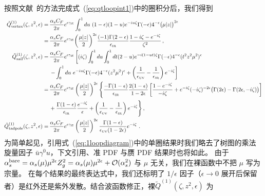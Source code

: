 \begin{widetext}
按照文献~\cite{Ji:2017rah}的方法完成式~(\ref{eq:qtloopint1})中的圈积分后，我们得到
\begin{align}\label{eq:1loopdiagram}
\tilde{Q}^{(1)}_{\rm vertex}(\zeta,z^2,\epsilon)
=\,& {\alpha_sC_F\over 2\pi}e^{\epsilon\gamma_E} \int_0^1 du\ (1-\epsilon)(1-u) e^{-iu \zeta}\Gamma(-\epsilon) 4^{-\epsilon} \big(\mu |z|\big)^{2\epsilon}
  \\
 =\,& {\alpha_sC_F\over 2\pi} e^{\epsilon\gamma_E}\biggl({\mu|z|\over2}\biggr)^{2\epsilon}
 \frac{(-1)\Gamma(2-\epsilon)}{\epsilon_{\mbox{\tiny IR}}}
 {1-i\zeta - e^{-i\zeta}\over \zeta^2}
  \,, \nonumber\\
\tilde{Q}^{(1)}_{\rm sail}(\zeta,z^2,\epsilon)
=\, & {\alpha_sC_F\over 2\pi}  e^{\epsilon\gamma_E}\left[(i\zeta) \int_0^1 du \int_0^1 dt (2-u) e^{-i(1-ut)\zeta} \Gamma(-\epsilon) 4^{-\epsilon}(t^2z^2\mu^2)^{\epsilon}\right.
  \nonumber\\
 &\left. -\int_0^1 du \ e^{-iu \zeta}\Gamma(-\epsilon) 4^{-\epsilon}(z^2\mu^2)^{\epsilon}  + \left({1\over\epsilon_{\mbox{\tiny UV}}} - {1\over \epsilon_{\mbox{\tiny IR}}}\right) e^{-i\zeta}\right]
  \nonumber\\
 =\,& {\alpha_sC_F\over 2\pi} e^{\epsilon\gamma_E} \left({\mu|z|\over2}\right)^{2\epsilon}
 \Bigg\{\frac{-\Gamma(1-\epsilon)}{\epsilon_{\mbox{\tiny IR}}}
 {2(1-\epsilon)\over 1-2\epsilon} \left[{1-e^{-i\zeta}\over -i\zeta} + e^{-i\zeta}(-i\zeta)^{-2\epsilon}\big(\Gamma(2\epsilon)-\Gamma(2\epsilon,-i\zeta)\big)
 \right]
  \nn\\
 & + {\Gamma(1-\epsilon)\over \epsilon_{\mbox{\tiny IR}} } \frac{e^{-i\zeta}}{\epsilon} + \left({1\over\epsilon_{\mbox{\tiny UV}}} - {1\over \epsilon_{\mbox{\tiny IR}}}\right) e^{-i\zeta} \Bigg\}
  \,, \nn\\
\tilde{Q}^{(1)}_{\rm tadpole}(\zeta,z^2,\epsilon)
=\, & {\alpha_sC_F\over 2\pi} e^{\epsilon\gamma_E}\left({\mu|z|\over2}\right)^{2\epsilon}  {\Gamma(1-\epsilon)\over \epsilon_{\mbox{\tiny UV}} (1-2\epsilon)}e^{-i\zeta}
 \ . \nn
\end{align}
为简单起见，引用式~(\ref{eq:1loopdiagram})中的单圈结果时我们略去了树图的乘法旋量因子 $\bar u\gamma^0 u$，下文引用\spcorr、准 PDF 与赝 PDF 结果时也将如此。
由于 $\alpha_s^{\rm bare}=\alpha_s(\mu) \mu^{2\epsilon} Z_g^2 = \alpha_s(\mu) \mu^{2\epsilon} + {\cal O}(\alpha_s^2)$ 与 $\mu$ 无关，我们在裸函数中不把 $\mu$ 写为宗量。
在每个结果的最终表达式中，我们还标明了 $1/\epsilon$ 因子（$\epsilon\to 0$ 展开后保留者）是红外还是紫外发散。结合波函数修正，裸\spcorr $\tilde{Q}^{(1)}(\zeta,z^2,\epsilon)$ 为
\begin{align} \label{eq:1loopioffe}

\end{align}
\end{widetext}
